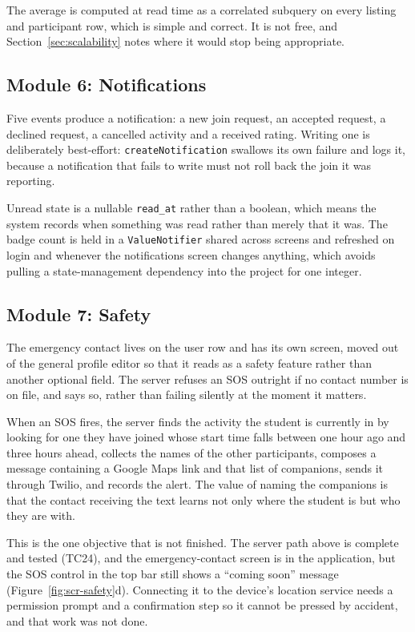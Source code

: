\documentclass{tietreport}
\begin{document}
The average is computed at read time as a correlated subquery on every listing and
participant row, which is simple and correct. It is not free, and Section~\ref{sec:scalability}
notes where it would stop being appropriate.

\subsection{Module 6: Notifications}

Five events produce a notification: a new join request, an accepted request, a declined
request, a cancelled activity and a received rating. Writing one is deliberately
best-effort: \texttt{createNotification} swallows its own failure and logs it, because
a notification that fails to write must not roll back the join it was reporting.

Unread state is a nullable \texttt{read\_at} rather than a boolean, which means the
system records when something was read rather than merely that it was. The badge count
is held in a \texttt{ValueNotifier} shared across screens and refreshed on login and
whenever the notifications screen changes anything, which avoids pulling a
state-management dependency into the project for one integer.

\subsection{Module 7: Safety}

The emergency contact lives on the user row and has its own screen, moved out of the
general profile editor so that it reads as a safety feature rather than another
optional field. The server refuses an SOS outright if no contact number is on file, and
says so, rather than failing silently at the moment it matters.

When an SOS fires, the server finds the activity the student is currently in by looking
for one they have joined whose start time falls between one hour ago and three hours
ahead, collects the names of the other participants, composes a message containing a
Google Maps link and that list of companions, sends it through Twilio, and records the
alert. The value of naming the companions is that the contact receiving the text learns
not only where the student is but who they are with.

This is the one objective that is not finished. The server path above is complete and
tested (TC24), and the emergency-contact screen is in the application, but the SOS
control in the top bar still shows a ``coming soon'' message
(Figure~\ref{fig:scr-safety}d). Connecting it to the device's location service needs a
permission prompt and a confirmation step so it cannot be pressed by accident, and that
work was not done.
\end{document}
